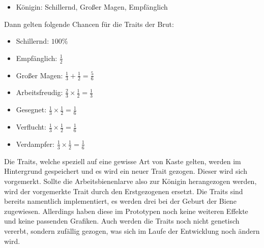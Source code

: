 \begin{itemize}
    \item Königin: Schillernd, Großer Magen, Empfänglich
\end{itemize} Dann gelten folgende Chancen für die Traits der Brut:

\begin{itemize}
    \item Schillernd: $100\%$
    \item Empfänglich: $\frac{1}{2}$
    \item Großer Magen: $\frac{1}{3} + \frac{1}{2} = \frac{5}{6}$
    \item Arbeitsfreudig: $\frac{2}{3} \times \frac{1}{2} = \frac{1}{3}$
    \item Gesegnet: $\frac{1}{3} \times \frac{1}{2} = \frac{1}{6}$
    \item Verflucht: $\frac{1}{3} \times \frac{1}{2} = \frac{1}{6}$
    \item Verdampfer: $\frac{1}{3} \times \frac{1}{2} = \frac{1}{6}$
\end{itemize} Die Traits, welche speziell auf eine gewisse Art von Kaste gelten, werden im Hintergrund gespeichert und es wird ein neuer Trait gezogen. Dieser wird sich vorgemerkt. Sollte die Arbeitsbienenlarve also zur Königin herangezogen werden, wird der vorgemerkte Trait durch den Erstgezogenen ersetzt. Die Traits sind bereits namentlich implementiert, es werden drei bei der Geburt der Biene zugewiesen. Allerdings haben diese im Prototypen noch keine weiteren Effekte und keine passenden Grafiken. Auch werden die Traits noch nicht genetisch vererbt, sondern zufällig gezogen, was sich im Laufe der Entwicklung noch ändern wird.

